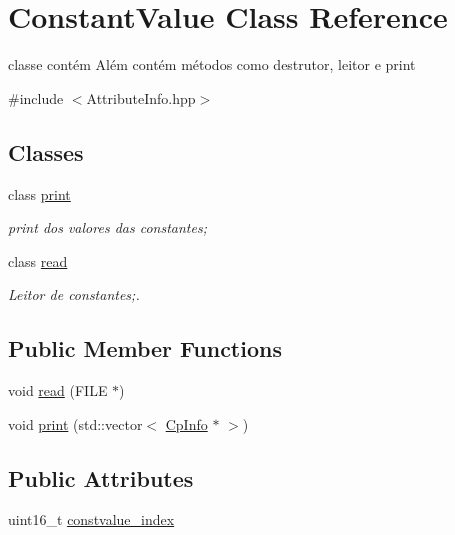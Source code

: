 \hypertarget{class_constant_value}{}\section{Constant\+Value Class Reference}
\label{class_constant_value}


classe contém Além contém métodos como destrutor, leitor e print  




{\ttfamily \#include $<$Attribute\+Info.\+hpp$>$}

\subsection*{Classes}
\begin{DoxyCompactItemize}
\item 
class \hyperlink{class_constant_value_1_1print}{print}
\begin{DoxyCompactList}\small\item\em print dos valores das constantes; \end{DoxyCompactList}\item 
class \hyperlink{class_constant_value_1_1read}{read}
\begin{DoxyCompactList}\small\item\em Leitor de constantes;. \end{DoxyCompactList}\end{DoxyCompactItemize}
\subsection*{Public Member Functions}
\begin{DoxyCompactItemize}
\item 
void \hyperlink{class_constant_value_aee71ff590a730276c8da00dbdee74ecf}{read} (F\+I\+LE $\ast$)
\item 
void \hyperlink{class_constant_value_a99dd9b4165766a0347e126c580fa93d0}{print} (std\+::vector$<$ \hyperlink{class_cp_info}{Cp\+Info} $\ast$ $>$)
\end{DoxyCompactItemize}
\subsection*{Public Attributes}
\begin{DoxyCompactItemize}
\item 
uint16\+\_\+t \hyperlink{class_constant_value_aaa51c41fc17e11c759e2d0dccbf178e8}{constvalue\+\_\+index}
\end{DoxyCompactItemize}


